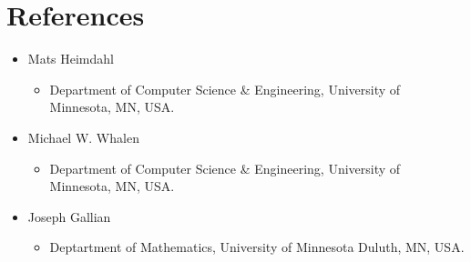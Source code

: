 \documentclass[11pt,a4paper,sans]{moderncv}        %
\begin{document}
\section{References}
\begin{itemize}


\item Mats Heimdahl
    \begin{itemize}
    \item Department of Computer Science \& Engineering, University of Minnesota, MN, USA.

    \end{itemize}
    
    \item Michael W. Whalen
    \begin{itemize}
    \item Department of Computer Science \& Engineering, University of Minnesota, MN, USA.

    \end{itemize}

\item Joseph Gallian
    \begin{itemize}
    \item Deptartment of Mathematics, University of Minnesota Duluth, MN, USA.

    \end{itemize}
\end{itemize}

%

\end{document}
